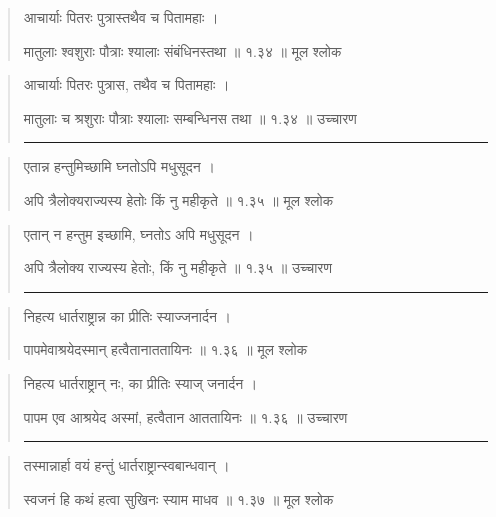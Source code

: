 \begin{quotation} 

आचार्याः पितरः पुत्रास्तथैव च पितामहाः  ।  
 
मातुलाः श्वशुराः पौत्राः श्यालाः संबंधिनस्तथा  ॥ १.३४ ॥  मूल श्लोक
\end{quotation}

\begin{quotation}

आचार्याः पितरः पुत्रास, तथैव च पितामहाः ।  

मातुलाः च श्रशुराः पौत्राः श्यालाः सम्बन्धिनस तथा  ॥ १.३४ ॥  उच्चारण

\noindent\rule{16cm}{0.4pt} 
\end{quotation}


\begin{quotation} 

एतान्न हन्तुमिच्छामि घ्नतोऽपि मधुसूदन  ।  
 
अपि त्रैलोक्यराज्यस्य हेतोः किं नु महीकृते  ॥ १.३५ ॥  मूल श्लोक
\end{quotation}

\begin{quotation}

एतान् न हन्तुम इच्छामि, घ्नतोऽ अपि मधुसूदन ।  

अपि त्रैलोक्य राज्यस्य हेतोः, किं नु महीकृते  ॥ १.३५ ॥   उच्चारण

\noindent\rule{16cm}{0.4pt} 
\end{quotation}


\begin{quotation} 

निहत्य धार्तराष्ट्रान्न का प्रीतिः स्याज्जनार्दन  ।  


पापमेवाश्रयेदस्मान्‌ हत्वैतानाततायिनः  ॥ १.३६ ॥  मूल श्लोक
\end{quotation}

\begin{quotation}

निहत्य धार्तराष्ट्रान् नः, का प्रीतिः स्याज् जनार्दन ।  


पापम एव आश्रयेद अस्मां, हत्वैतान आततायिनः  ॥ १.३६ ॥  उच्चारण

\noindent\rule{16cm}{0.4pt} 
\end{quotation}


\begin{quotation} 

तस्मान्नार्हा वयं हन्तुं धार्तराष्ट्रान्स्वबान्धवान्‌  ।  
 

स्वजनं हि कथं हत्वा सुखिनः स्याम माधव  ॥ १.३७ ॥  मूल श्लोक
\end{quotation}

